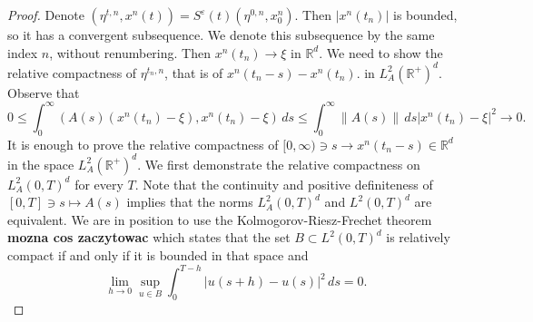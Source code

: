 \documentclass[11pt, leqno]{amsart}
\theoremstyle{definition}
\def\R{\mathbb{R}}
\begin{document}
\begin{proof}
Denote $(\eta^{t,n},x^n(t)) =  S^\varepsilon(t)(\eta^{0,n},x_0^n)$. Then $|x^n(t_n)|$ is bounded, so it has a convergent subsequence. We denote this subsequence by the same index $n$, without renumbering. Then $x^n(t_n)\to \xi$ in $\R^d$. We need to show the relative compactness of $\eta^{{t_n},n}$, that is of
$
x^n(t_n-s) - x^n(t_n).
$ in $L^2_A(\R^+)^d$. Observe that
$$
0 \leq \int_0^\infty (A(s)(x^n(t_n)-\xi),x^n(t_n)-\xi)\, ds\leq \int_0^\infty \|A(s)\|\, ds |x^n(t_n)-\xi|^2 \to 0.
$$
It is enough to prove the relative compactness of $[0,\infty) \ni s \to x^n(t_n-s)\in \R^d$ in the space  $L^2_A(\R^+)^d$. We first demonstrate the relative compactness on $L^2_A(0,T)^d$ for every $T$. Note that the continuity and positive definiteness of $[0,T]\ni s \mapsto A(s)$ implies that the norms $L^2_A(0,T)^d$ and $L^2(0,T)^d$ are equivalent. We are in position to use the Kolmogorov-Riesz-Frechet theorem \textbf{mozna cos zaczytowac}  which states that the set $B\subset L^2(0,T)^d$ is relatively compact if and only if it is bounded in that space and
$$
\lim_{h\to 0}\sup_{u\in B}\int_0^{T-h}|u(s+h)-u(s)|^2\, ds = 0.
$$


\end{proof}
\end{document}
